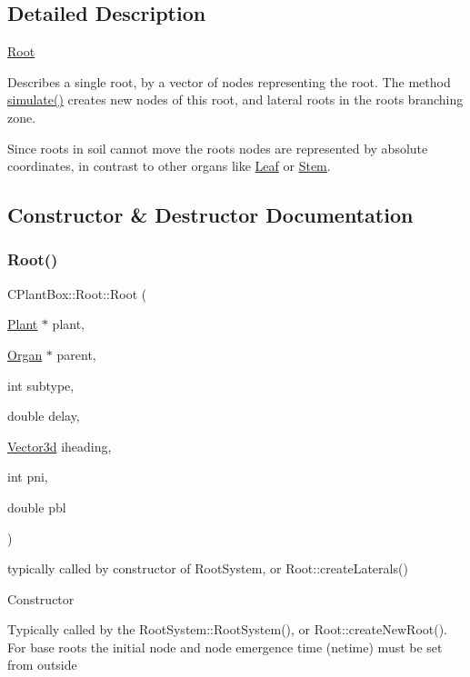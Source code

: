 \subsection{Detailed Description}
\hyperlink{classCPlantBox_1_1Root}{Root}

Describes a single root, by a vector of nodes representing the root. The method \hyperlink{classCPlantBox_1_1Root_af2fa9d229ab05897214e0ec224f0ae71}{simulate()} creates new nodes of this root, and lateral roots in the root\textquotesingle{}s branching zone.

Since roots in soil cannot move the roots nodes are represented by absolute coordinates, in contrast to other organs like \hyperlink{classCPlantBox_1_1Leaf}{Leaf} or \hyperlink{classCPlantBox_1_1Stem}{Stem}. 

\subsection{Constructor \& Destructor Documentation}
\mbox{\label{classCPlantBox_1_1Root_a9192f7ecf7ee409e8089365175b53f25}} 
\subsubsection{\texorpdfstring{Root()}{Root()}}
{\footnotesize\ttfamily C\+Plant\+Box\+::\+Root\+::\+Root (\begin{DoxyParamCaption}\item[{\hyperlink{classCPlantBox_1_1Plant}{Plant} $\ast$}]{plant,  }\item[{\hyperlink{classCPlantBox_1_1Organ}{Organ} $\ast$}]{parent,  }\item[{int}]{subtype,  }\item[{double}]{delay,  }\item[{\hyperlink{classCPlantBox_1_1Vector3d}{Vector3d}}]{iheading,  }\item[{int}]{pni,  }\item[{double}]{pbl }\end{DoxyParamCaption})}



typically called by constructor of Root\+System, or Root\+::create\+Laterals() 

Constructor

Typically called by the Root\+System\+::\+Root\+System(), or Root\+::create\+New\+Root(). For base roots the initial node and node emergence time (netime) must be set from outside


